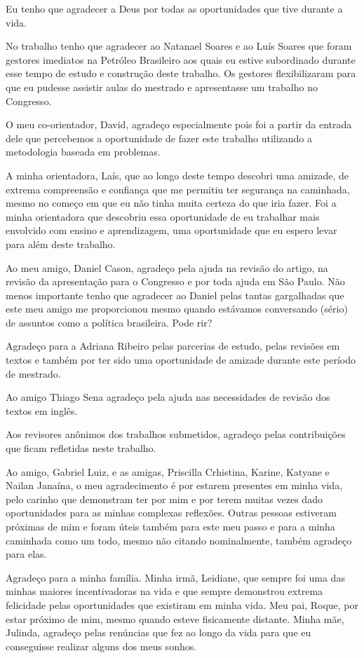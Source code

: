 \acknowledgements
Eu tenho que agradecer a Deus por todas as oportunidades
que tive durante a vida.

No trabalho tenho que agradecer ao Natanael Soares e ao
Luís Soares que foram gestores imediatos na Petróleo
Brasileiro aos quais eu estive subordinado durante
esse tempo de estudo e construção deste trabalho.
Os gestores flexibilizaram para que eu pudesse
assistir aulas do mestrado e apresentasse
um trabalho no Congresso.

O meu co-orientador, David, agradeço especialmente
pois foi a partir da entrada dele que percebemos
a oportunidade de fazer este trabalho utilizando a
metodologia baseada em problemas.

A minha orientadora, Laís, que ao longo deste tempo descobri
uma amizade, de extrema compreensão e confiança
que me permitiu ter segurança na caminhada, mesmo no
começo em que eu não tinha muita certeza do que iria
fazer.
Foi a minha orientadora que descobriu essa oportunidade
de eu trabalhar mais envolvido com ensino e aprendizagem,
uma oportunidade que eu espero levar para
além deste trabalho.

Ao meu amigo, Daniel Cason, agradeço pela ajuda na
revisão do artigo, na revisão da apresentação
para o Congresso e por toda ajuda em São Paulo.
Não menos importante tenho que agradecer ao Daniel
pelas tantas gargalhadas que este meu amigo me
proporcionou mesmo quando estávamos conversando
(sério) de assuntos como a política brasileira.
Pode rir?

Agradeço para a Adriana Ribeiro pelas parcerias
de estudo, pelas revisões em textos e também
por ter sido uma oportunidade de amizade durante
este período de mestrado.

Ao amigo Thiago Sena agradeço pela ajuda
nas necessidades de revisão dos textos em
inglês.

Aos revisores anônimos dos trabalhos submetidos,
agradeço pelas contribuições que ficam
refletidas neste trabalho.

Ao amigo, Gabriel Luiz, e as amigas,
Priscilla Crhistina, Karine, Katyane
e Nailan Janaína, o meu agradecimento é
por estarem presentes em minha vida,
pelo carinho que demonstram ter
por mim e por terem muitas vezes dado
oportunidades para as minhas complexas
reflexões.
Outras pessoas estiveram próximas de mim e
foram úteis também para este meu passo e para
a minha caminhada como um todo, mesmo não citando
nominalmente, também agradeço para elas.

Agradeço para a minha família.
Minha irmã, Leidiane, que sempre foi uma das minhas
maiores incentivadoras na vida e que sempre
demonstrou extrema felicidade pelas oportunidades
que existiram em minha vida.
Meu pai, Roque, por estar próximo de mim,
mesmo quando esteve fisicamente distante.
Minha mãe, Julinda, agradeço pelas renúncias que
fez ao longo da vida para que eu conseguisse realizar
alguns dos meus sonhos.
